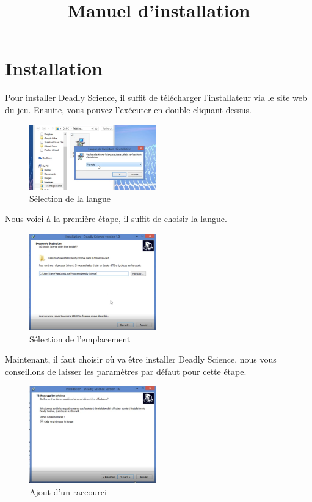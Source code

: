 \documentclass{article}
\title{Manuel d'installation}
\begin{document}
\maketitle
\tableofcontents

\newpage
\section{Installation}

Pour installer Deadly Science, il suffit de télécharger l'installateur via le site web du jeu. Ensuite, vous pouvez l'exécuter en double cliquant dessus.

\begin{figure}[H]
	\centering
	\includegraphics[width=0.49\textwidth]{setup/inst_1.png}
	\caption{Sélection de la langue}
	\label{setup_0}
\end{figure}

Nous voici à la première étape, il suffit de choisir la langue.

\begin{figure}[H]
	\centering
	\includegraphics[width=0.49\textwidth]{setup/inst_2.png}
	\caption{Sélection de l'emplacement}
	\label{setup_1}
\end{figure}

Maintenant, il faut choisir où va être installer Deadly Science, nous vous conseillons de laisser les paramètres par défaut pour cette étape.

\begin{figure}[H]
	\centering
	\includegraphics[width=0.49\textwidth]{setup/inst_3.png}
	\caption{Ajout d'un raccourci}
	\label{setup_2}
\end{figure}
\end{document}
